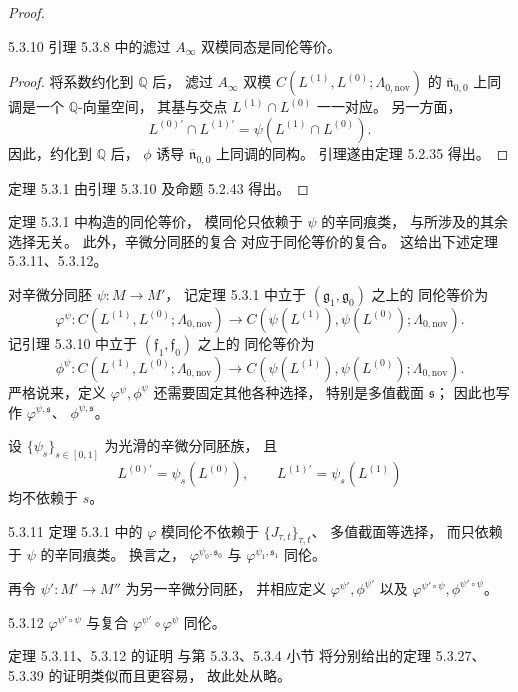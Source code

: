 \begin{proof}
\begin{lemma}{5.3.10}\label{lem:5-3-10}
引理 5.3.8 中的滤过 $A_\infty$
双模同态是同伦等价。
\end{lemma}
\begin{proof}
将系数约化到 $\mathbb Q$ 后，
滤过 $A_\infty$ 双模
$C(L^{(1)},L^{(0)};
  \Lambda_{0,\mathrm{nov}})$
的 $\overline{\mathfrak n}_{0,0}$
上同调是一个 $\mathbb Q$-向量空间，
其基与交点
$L^{(1)}\cap L^{(0)}$
一一对应。
另一方面，
\[
L^{(0)\prime}\cap L^{(1)\prime}
=\psi(L^{(1)}\cap L^{(0)}).
\]
因此，约化到 $\mathbb Q$ 后，
$\phi$ 诱导
$\overline{\mathfrak n}_{0,0}$
上同调的同构。
引理遂由定理 5.2.35 得出。
\end{proof}

定理 5.3.1 由引理 5.3.10
及命题 5.2.43 得出。
\end{proof}

定理 5.3.1 中构造的同伦等价，
模同伦只依赖于 $\psi$ 的辛同痕类，
与所涉及的其余选择无关。
此外，辛微分同胚的复合
对应于同伦等价的复合。
这给出下述定理 5.3.11、5.3.12。

对辛微分同胚
$\psi\colon M\to M'$，
记定理 5.3.1 中立于
$(\mathfrak g_1,\mathfrak g_0)$ 之上的
同伦等价为
\[
\varphi^\psi\colon
C(L^{(1)},L^{(0)};\Lambda_{0,\mathrm{nov}})
\longrightarrow
C(\psi(L^{(1)}),\psi(L^{(0)});
  \Lambda_{0,\mathrm{nov}}).
\]
记引理 5.3.10 中立于
$(\mathfrak f_1,\mathfrak f_0)$ 之上的
同伦等价为
\[
\phi^\psi\colon
C(L^{(1)},L^{(0)};\Lambda_{0,\mathrm{nov}})
\longrightarrow
C(\psi(L^{(1)}),\psi(L^{(0)});
  \Lambda_{0,\mathrm{nov}}).
\]
严格说来，定义
$\varphi^\psi,\phi^\psi$
还需要固定其他各种选择，
特别是多值截面 $\mathfrak s$；
因此也写作
$\varphi^{\psi,\mathfrak s}$、
$\phi^{\psi,\mathfrak s}$。

设
$\{\psi_s\}_{s\in[0,1]}$
为光滑的辛微分同胚族，
且
\[
L^{(0)\prime}=\psi_s(L^{(0)}),
\qquad
L^{(1)\prime}=\psi_s(L^{(1)})
\]
均不依赖于 $s$。

\begin{theorem}{5.3.11}\label{thm:5-3-11}
定理 5.3.1 中的 $\varphi$
模同伦不依赖于
$\{J_{\tau,t}\}_{\tau,t}$、
多值截面等选择，
而只依赖于 $\psi$ 的辛同痕类。
换言之，
$\varphi^{\psi_0,\mathfrak s_0}$
与
$\varphi^{\psi_1,\mathfrak s_1}$
同伦。
\end{theorem}

再令
$\psi'\colon M'\to M''$
为另一辛微分同胚，
并相应定义
$\varphi^{\psi'},\phi^{\psi'}$
以及
$\varphi^{\psi'\circ\psi},
 \phi^{\psi'\circ\psi}$。
\begin{theorem}{5.3.12}\label{thm:5-3-12}
$\varphi^{\psi'\circ\psi}$
与复合
$\varphi^{\psi'}\circ\varphi^\psi$
同伦。
\end{theorem}

定理 5.3.11、5.3.12 的证明
与第 5.3.3、5.3.4 小节
将分别给出的定理 5.3.27、5.3.39
的证明类似而且更容易，
故此处从略。
